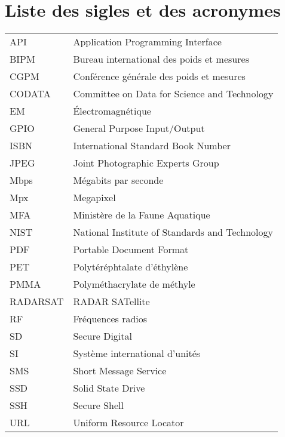 
%
%

\chapter{Liste des sigles et des acronymes}


\begin{flushleft}
   \begin{tabular}{@{}ll}
      API & Application Programming Interface \\
      BIPM & Bureau international des poids et mesures\\
      CGPM & Conférence générale des poids et mesures\\
      CODATA & Committee on Data for Science and Technology\\
      EM & Électromagnétique\\
      GPIO & General Purpose Input/Output \\
      ISBN & International Standard Book Number\\
      JPEG & Joint Photographic Experts Group\\
      Mbps & Mégabits par seconde \\
      Mpx & Megapixel \\
      MFA & Ministère de la Faune Aquatique \\
      NIST & National Institute of Standards and Technology \\
      PDF & Portable Document Format \\
      PET & Polytéréphtalate d'éthylène \\
      PMMA & Polyméthacrylate de méthyle \\
      RADARSAT & RADAR SATellite\\
      RF & Fréquences radios\\
      SD & Secure Digital \\
      SI & Système international d'unités \\
      SMS & Short Message Service \\
      SSD & Solid State Drive \\
      SSH &Secure Shell \\
      URL & Uniform Resource Locator \\
   \end{tabular}
\end{flushleft}






